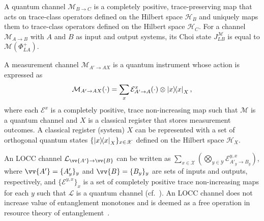 \documentclass[aps,pra,twocolumn,superscriptaddress,longbibliography]{revtex4-1}
\newcommand{\mc}[1]{\mathcal{#1}}
\newcommand{\msc}[1]{\mathscr{#1}}
\begin{document}
A quantum channel $\mc{M}_{B\to C}$ is a completely positive,  trace-preserving map that acts on trace-class operators defined on the Hilbert space $\mc{H}_B$ and uniquely maps them to trace-class operators defined on the Hilbert space $\mc{H}_C$. For a channel $\mc{M}_{A\to B}$ with $A$ and $B$ as input and output systems, its Choi state $J^\mc{M}_{LB}$ is equal to $\mc{M}(\Phi^+_{LA})$.

A measurement channel $\mc{M}_{A'\to AX}$ is a quantum instrument whose action is expressed as
\begin{equation}
    \mc{M}_{A'\to AX}(\cdot)=\sum_{x}\mathcal{E}^x_{A'\to A}(\cdot)\otimes\op{x}_X,
\end{equation}
where each $\mathcal{E}^x$ is a completely positive, trace non-increasing map such that $\mc{M}$ is a quantum channel and $X$ is a classical register that stores measurement outcomes. A classical register (system) $X$ can be represented with a set of orthogonal quantum states $\{\op{x}_X\}_{x\in\msc{X}}$ defined on the Hilbert space $\mc{H}_X$. 

An LOCC channel $\mc{L}_{\vv{A'}\to \vv{B}}$ can be written as $\sum_{x\in\msc{X}}(\bigotimes_{y\in\msc{Y}}\mc{E}^{y,x}_{A'_y\to B_y})$, where $\vv{A'}=\{A'_{y}\}_y$ and $\vv{B}=\{B_{y}\}_y$ are sets of inputs and outputs, respectively, and $\{\mc{E}^{y,x}\}_{x}$ is a set of completely positive trace non-increasing maps for each $y$ such that $\mc{L}$ is a quantum channel (cf.~\cite{CLM+14}). An LOCC channel does not increase value of entanglement monotones and is deemed as a free operation in resource theory of entanglement~\cite{HHHO09,AH09,CLM+14}.
\end{document}
